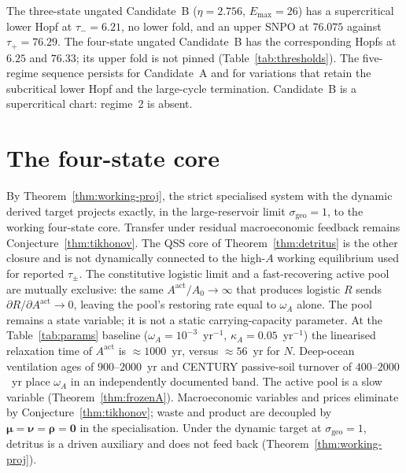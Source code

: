 \documentclass[11pt]{article}
\theoremstyle{definition}
\begin{document}
The three-state ungated Candidate~B ($\eta=2.756$, $E_{\max}=26$) has a supercritical lower Hopf at $\tau_-=6.21$, no lower fold, and an upper SNPO at $76.075$ against $\tau_+=76.29$. The four-state ungated Candidate~B has the corresponding Hopfs at $6.25$ and $76.33$; its upper fold is not pinned (Table~\ref{tab:thresholds}). The five-regime sequence persists for Candidate~A and for variations that retain the subcritical lower Hopf and the large-cycle termination. Candidate~B is a supercritical chart: regime~2 is absent.

\section{The four-state core}
\label{sec:four-state}

By Theorem~\ref{thm:working-proj}, the strict specialised system with the dynamic derived target projects exactly, in the large-reservoir limit $\sigma_{\mathrm{geo}}=1$, to the working four-state core. Transfer under residual macroeconomic feedback remains Conjecture~\ref{thm:tikhonov}. The QSS core of Theorem~\ref{thm:detritus} is the other closure and is not dynamically connected to the high-$A$ working equilibrium used for reported $\tau_\pm$. The constitutive logistic limit and a fast-recovering active pool are mutually exclusive: the same $A^{\mathrm{act}}/A_0\to\infty$ that produces logistic $R$ sends $\partial R/\partial A^{\mathrm{act}}\to 0$, leaving the pool's restoring rate equal to $\omega_A$ alone. The pool remains a state variable; it is not a static carrying-capacity parameter. At the Table~\ref{tab:params} baseline ($\omega_A=10^{-3}$~yr$^{-1}$, $\kappa_A=0.05$~yr$^{-1}$) the linearised relaxation time of $A^{\mathrm{act}}$ is $\approx 1000$~yr, versus $\approx 56$~yr for $N$. Deep-ocean ventilation ages of $900$--$2000$~yr \cite{skinner2017} and CENTURY passive-soil turnover of $400$--$2000$~yr \cite{parton1987,olson1963} place $\omega_A$ in an independently documented band. The active pool is a slow variable (Theorem~\ref{thm:frozenA}). Macroeconomic variables and prices eliminate by Conjecture~\ref{thm:tikhonov}; waste and product are decoupled by $\boldsymbol\mu=\boldsymbol\nu=\boldsymbol\rho=\mathbf 0$ in the specialisation. Under the dynamic target at $\sigma_{\mathrm{geo}}=1$, detritus is a driven auxiliary and does not feed back (Theorem~\ref{thm:working-proj}).
\end{document}
